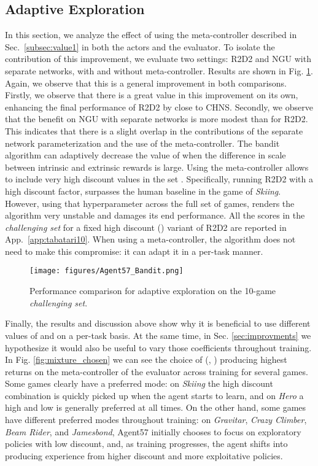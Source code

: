 \documentclass{article}
\begin{document}
\subsection{Adaptive Exploration}
\label{subsec:adaptive2}
In this section, we analyze the effect of using the meta-controller described in Sec.~\ref{subsec:value1} in both the actors and the evaluator. To isolate the contribution of this improvement, we evaluate two settings: R2D2 and NGU with separate networks, with and without meta-controller.
Results are shown in Fig. \ref{fig:r2d2progression}. Again, we observe that this is a general improvement in both comparisons. Firstly, we observe that there is a great value in this improvement on its own, enhancing the final performance of R2D2 by close to  CHNS. Secondly, we observe that the benefit on NGU with separate networks is more modest than for R2D2. This indicates that there is a slight overlap in the contributions of the separate network parameterization and the use of the meta-controller.
The bandit algorithm can adaptively decrease the value of  when the difference in scale between intrinsic and extrinsic rewards is large. 
Using the meta-controller allows to include very high discount values in the set .
Specifically, running R2D2 with a high discount factor,  surpasses the human baseline in the game of \textit{Skiing}. However, using that hyperparameter across the full set of games, renders the algorithm very unstable and damages its end performance. All the scores in the \emph{challenging set} for a fixed high discount () variant of R2D2 are reported in App.~\ref{app:tabatari10}.
When using a meta-controller, the algorithm does not need to make this compromise: it can adapt it in a per-task manner.
\begin{figure}[!t]
    \centering
    \texttt{[image: figures/Agent57\_Bandit.png]}
    \caption{Performance comparison for adaptive exploration on the 10-game \emph{challenging set}.} 
    \label{fig:r2d2progression}
    \vspace{-3ex}
\end{figure}

Finally, the results and discussion above show why it is beneficial to use different values of  and  on a per-task basis. At the same time, in Sec. \ref{sec:improvments} we hypothesize it would also be useful to vary those coefficients throughout training. In Fig. \ref{fig:mixture_chosen} we can see the choice of (, ) producing highest returns on the meta-controller of the evaluator across training for several games. Some games clearly have a preferred mode: on \textit{Skiing} the high discount combination is quickly picked up when the agent starts to learn, and on \textit{Hero} a high  and low  is generally preferred at all times. On the other hand, some games have different preferred modes throughout training: on \textit{Gravitar}, \textit{Crazy Climber}, \textit{Beam Rider}, and \textit{Jamesbond}, Agent57 initially chooses to focus on exploratory policies with low discount, and, as training progresses, the agent shifts into producing experience from higher discount and more exploitative policies.
\end{document}
